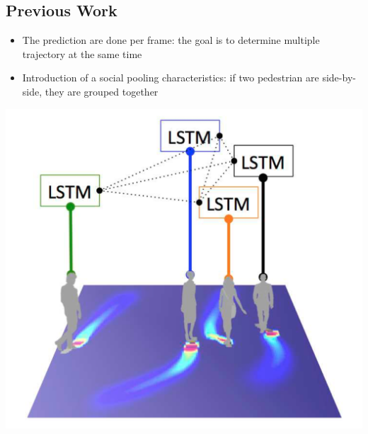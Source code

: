 \documentclass[a0,portrait]{a0poster}
\begin{document}
\begin{multicols}{2}
\section*{Previous Work \cite{Alahi}}
\begin{minipage}[]{0.5\linewidth}
\begin{itemize}
\justifying
\item The prediction are done per frame: the goal is to determine multiple trajectory at the same time
\item Introduction of a social pooling characteristics: if two pedestrian are side-by-side, they are grouped together
\end{itemize}
\end{minipage}
\hfill
\begin{minipage}[]{0.5\linewidth}
\centerline {\includegraphics[scale = 0.35]{figure/socialLSTM}}
\end{minipage}
%

\end{multicols}
\end{document}
